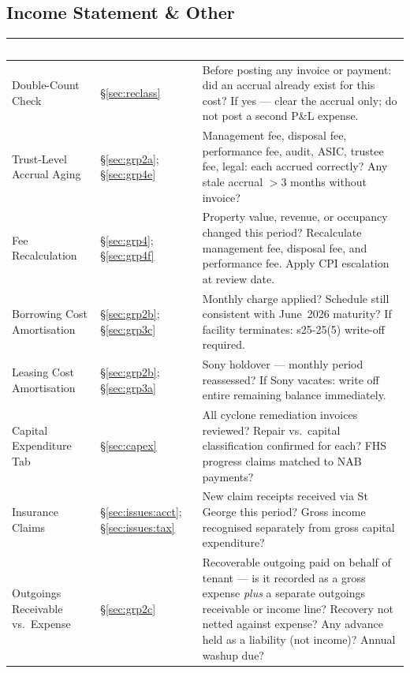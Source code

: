 \documentclass[10pt,a4paper]{article}
\begin{document}
\subsection{Income Statement \& Other}
{\small\sffamily
\begin{tabularx}{\textwidth}{@{} L{3.4cm} L{1.6cm} X @{}}
\textcolor{white}{\bfseries Item} & \textcolor{white}{\bfseries Guide} & \textcolor{white}{\bfseries Key Question} \\
\midrule
Double-Count Check & \S\ref{sec:reclass} & Before posting any invoice or payment: did an accrual already exist for this cost? If yes --- clear the accrual only; do not post a second P\&L expense. \\
Trust-Level Accrual Aging & \S\ref{sec:grp2a}; \S\ref{sec:grp4e} & Management fee, disposal fee, performance fee, audit, ASIC, trustee fee, legal: each accrued correctly? Any stale accrual $>$3 months without invoice? \\
Fee Recalculation & \S\ref{sec:grp4}; \S\ref{sec:grp4f} & Property value, revenue, or occupancy changed this period? Recalculate management fee, disposal fee, and performance fee. Apply CPI escalation at review date. \\
Borrowing Cost Amortisation & \S\ref{sec:grp2b}; \S\ref{sec:grp3c} & Monthly charge applied? Schedule still consistent with June~2026 maturity? If facility terminates: s25-25(5) write-off required. \\
Leasing Cost Amortisation & \S\ref{sec:grp2b}; \S\ref{sec:grp3a} & Sony holdover --- monthly period reassessed? If Sony vacates: write off entire remaining balance immediately. \\
Capital Expenditure Tab & \S\ref{sec:capex} & All cyclone remediation invoices reviewed? Repair vs.\ capital classification confirmed for each? FHS progress claims matched to NAB payments? \\
Insurance Claims & \S\ref{sec:issues:acct}; \S\ref{sec:issues:tax} & New claim receipts received via St George this period? Gross income recognised separately from gross capital expenditure? \\
Outgoings Receivable vs.\ Expense & \S\ref{sec:grp2c} & Recoverable outgoing paid on behalf of tenant --- is it recorded as a gross expense \emph{plus} a separate outgoings receivable or income line? Recovery not netted against expense? Any advance held as a liability (not income)? Annual washup due? \\

\end{tabularx}}
\end{document}
